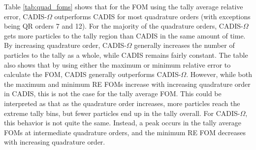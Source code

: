 Table \ref{tab:quad_foms} shows that for the FOM using the tally average relative error,
CADIS-$\Omega$ outperforms CADIS for most quadrature orders (with exceptions
being QR orders 7 and 12). For the majority of the quadrature orders,
CADIS-$\Omega$ gets more particles to the tally region than CADIS in the same
amount of time. By increasing
quadrature order, CADIS-$\Omega$ generally increases the number of particles to
the tally as a whole, while CADIS remains fairly constant. 
The table
also shows that by using either the maximum or minimum relative error to
calculate the FOM, CADIS generally outperforms CADIS-$\Omega$. However, while
both the maximum and minimum RE FOMs increase with increasing quadrature order
in CADIS, this is not the case for the tally average FOM. This could be
interpreted as that as the quadrature order increases, more particles reach the extreme
tally bins, but fewer particles end up in the tally overall. For CADIS-$\Omega$,
this behavior is not quite the same. Instead, a peak occurs in the tally
average FOMs at intermediate quadrature orders, and the minimum RE FOM decreases
with increasing quadrature order.


